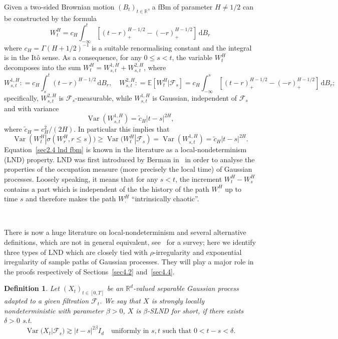 \documentclass[10pt]{article}
\newcommand{\mathd}{\mathrm{d}}
\newcommand{\nobracket}{}
\newcommand{\tmop}[1]{\ensuremath{\operatorname{#1}}}
\newtheorem{definition}[theorem]{Definition}
\begin{document}
Given a two-sided Brownian motion $(B_t)_{t \in \mathbb{R}}$, a fBm of
parameter $H \neq 1 / 2$ can be constructed by the formula
\begin{equation}
  W^H_t = c_H \int_{- \infty}^t [(t - r)^{H - 1 / 2}_+ - (- r)_+^{H - 1 / 2}]
  \, \mathd B_r \label{sec2.4 non canonical representation}
\end{equation}
where $c_H = \Gamma (H + 1 / 2)^{- 1}$ is a suitable renormalising constant
and the integral is in the It\^{o} sense. As a consequence, for any $0
\leqslant s < t$, the variable $W^H_t$ decomposes into the sum $W^H_t = W^{1,
H}_{s, t} + W^{2, H}_{s, t}$, where
\[ W^{1, H}_{s, t} : = c_H \int_s^t (t - r)^{H - 1 / 2} \, \mathd B_r, \quad
   W^{2, H}_{s, t} : =\mathbb{E} [W^H_t | \mathcal{F}_s] = c_H
   \int_{- \infty}^s [(t - r)^{H - 1 / 2}_+ - (- r)_+^{H - 1 / 2}] \, \mathd
   B_r ; \]
specifically, $W^{2, H}_{s, t}$ is $\mathcal{F}_s$-measurable, while $W^{1,
H}_{s, t}$ is Gaussian, independent of $\mathcal{F}_s$ and with variance
\[ \tmop{Var} (W^{1, H}_{s, t}) = \tilde{c}_H | t - s |^{2 H}, \]
where $\tilde{c}_H = c_H^2 / (2 H)$. In particular this implies that
\begin{equation}
  \tmop{Var} (W^H_t | \sigma (W^H_r, r \leqslant s \nobracket)) \geqslant
  \tmop{Var} (W^H_t | \mathcal{F}_s \nobracket) = \tmop{Var} (W^{1, H}_{s, t})
  = \tilde{c}_H | t - s |^{2 H} . \label{sec2.4 lnd fbm}
\end{equation}
Equation~\eqref{sec2.4 lnd fbm} is known in the literature as a
local\mbox{-}nondeterminism (LND) property. LND was first introduced by Berman
in~{\cite{berman73}} in order to analyse the properties of the occupation
measure (more precisely the local time) of Gaussian processes. Loosely
speaking, it means that for any $s < t$, the increment $W_t^H - W^H_s$
contains a part which is independent of the the history of the path
$W^H_{\cdot}$ up to time $s$ and therefore makes the path $W^H_{\cdot}$
``intrinsically chaotic''.

\

There is now a huge literature on local\mbox{-}nondeterminism and several
alternative definitions, which are not in general equivalent,
see~{\cite{xiao}} for a survey; here we identify three types of LND which are
closely tied with $\rho$\mbox{-}irregularity and exponential irregularity of
sample paths of Gaussian processes. They will play a major role in the proofs
respectively of Sections~\ref{sec4.2} and~\ref{sec4.4}.

\begin{definition}
  \label{sec2.4 defn strong lnd}Let $(X_t)_{t \in [0, T]}$ be an
  $\mathbb{R}^d$-valued separable Gaussian process adapted to a given
  filtration $\mathcal{F}_t$. We say that $X$ is strongly locally
  nondeterministic with parameter $\beta > 0$, $X$ is $\beta$\mbox{-}SLND for
  short, if there exists $\delta > 0$ s.t.
  \begin{equation}
    \tmop{Var} (X_t | \mathcal{F}_s \nobracket) \gtrsim | t - s |^{2 \beta}
    I_d \quad \text{uniformly in } s, t \text{ such that } 0 < t - s < \delta
    . \label{sec2.4 strong lnd eq}
  \end{equation}
\end{definition}
\end{document}
